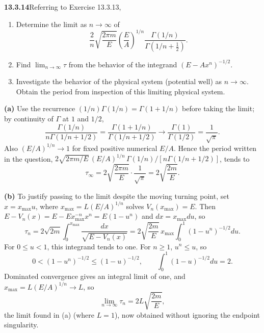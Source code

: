 \par\bigskip
\noindent\textbf{13.3.14}\quad Referring to Exercise 13.3.13,
\begin{enumerate}
\item[(a)] Determine the limit as $n\to\infty$ of
  \[
  \frac{2}{n}\sqrt{\frac{2\pi m}{E}}\left(\frac{E}{A}\right)^{1/n}
  \frac{\Gamma(1/n)}{\Gamma(1/n+\frac{1}{2})}.
  \]
\item[(b)] Find $\lim_{n\to\infty}\tau$ from the behavior of the integrand
  $(E-Ax^{n})^{-1/2}$.
\item[(c)] Investigate the behavior of the physical system (potential well)
  as $n\to\infty$. Obtain the period from inspection of this limiting
  physical system.
\end{enumerate}
\par\smallskip
{}
\solution
\textbf{(a)} Use the recurrence $(1/n)\Gamma(1/n)=\Gamma(1+1/n)$
before taking the limit; by continuity of $\Gamma$ at $1$ and $1/2$,
\[
\frac{\Gamma(1/n)}{n\Gamma(1/n+1/2)}
=\frac{\Gamma(1+1/n)}{\Gamma(1/n+1/2)}
\longrightarrow\frac{\Gamma(1)}{\Gamma(1/2)}=\frac1{\sqrt\pi}.
\]
Also $(E/A)^{1/n}\to1$ for fixed positive numerical $E/A$.
Hence the period written in the question,
$2\sqrt{2\pi m/E}\,(E/A)^{1/n}\,\Gamma(1/n)/[n\Gamma(1/n+1/2)]$,
tends to
\[
\tau_\infty=2\sqrt{\frac{2\pi m}E}\cdot\frac1{\sqrt\pi}
=\boxed{2\sqrt{\frac{2m}E}}.
\]

\textbf{(b)} To justify passing to the limit despite the moving
turning point, set $x=x_{\max}u$, where
$x_{\max}=L(E/A)^{1/n}$ solves $V_n(x_{\max})=E$.  Then
$E-V_n(x)=E-Ex_{\max}^{-n}x^n=E(1-u^n)$ and $dx=x_{\max}du$, so
\[
\tau_n=2\sqrt{2m}\int_0^{x_{\max}}\frac{dx}{\sqrt{E-V_n(x)}}
=2\sqrt{\frac{2m}E}\,x_{\max}
\int_0^1(1-u^n)^{-1/2}du.
\]
For $0\le u<1$, this integrand tends to one.  For $n\ge1$,
$u^n\le u$, so
\[
0<(1-u^n)^{-1/2}\le(1-u)^{-1/2},
\qquad\int_0^1(1-u)^{-1/2}du=2.
\]
Dominated convergence gives an integral limit of one, and
$x_{\max}=L(E/A)^{1/n}\to L$, so
\[
\boxed{\lim_{n\to\infty}\tau_n=2L\sqrt{\frac{2m}E}},
\]
the limit found in (a) (where $L=1$), now obtained without
ignoring the endpoint singularity.

